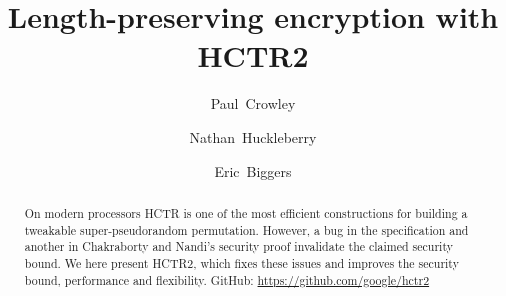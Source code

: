 \documentclass[journal=tosc,preprint,floatrow]{iacrtrans}
\author{Paul~Crowley \and Nathan~Huckleberry \and Eric~Biggers}
\institute{Google LLC \\ \email[paulcrowley@google.com,nhuck@google.com,ebiggers@google.com]{{paulcrowley,nhuck,ebiggers}@google.com}}
\title{Length-preserving encryption with HCTR2}
\begin{document}
\maketitle
{}

\begin{abstract}
On modern processors HCTR\cite{hctr} is
one of the most efficient constructions
for building a tweakable super-pseudorandom permutation. However,
a bug in the specification and another in
Chakraborty and Nandi's security proof\cite{hctrquad}
invalidate the claimed security bound. We here present HCTR2,
which fixes these issues and improves the
security bound, performance and flexibility.
GitHub: \url{https://github.com/google/hctr2}
\end{abstract}








\printbibliography[heading=bibintoc]
\appendix

%
\end{document}
